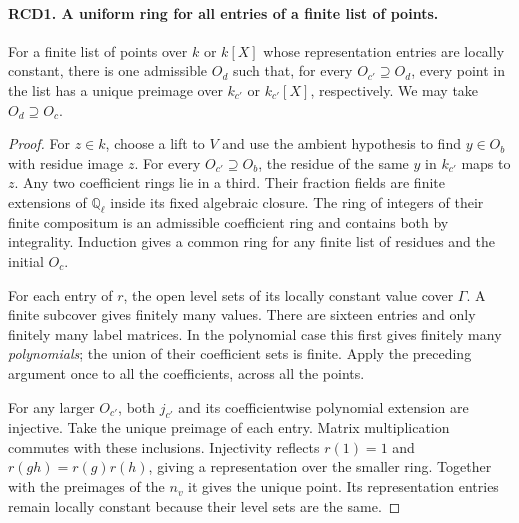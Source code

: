 \paragraph{RCD1. A uniform ring for all entries of a finite list of points.}
For a finite list of points over $k$ or $k[X]$ whose representation
entries are locally constant, there is one admissible $O_d$ such that,
for every $O_{c'}\supseteq O_d$, every point in the list has a unique
preimage over $k_{c'}$ or $k_{c'}[X]$, respectively. We may take
$O_d\supseteq O_c$.
\begin{proof}
For $z\in k$, choose a lift to $V$ and use the ambient hypothesis to
find $y\in O_b$ with residue image $z$. For every $O_{c'}\supseteq O_b$,
the residue of the same $y$ in $k_{c'}$ maps to $z$.
Any two coefficient rings lie in a third. Their fraction fields are
finite extensions of $\mathbb Q_\ell$ inside its fixed algebraic
closure. The ring of integers of their finite compositum is an
admissible coefficient ring and contains both by integrality.
Induction gives a common ring for any finite list of residues and
the initial $O_c$.

For each entry of $r$, the open level sets of its locally constant
value cover $\Gamma$. A finite subcover gives finitely many values.
There are sixteen entries and only finitely many label matrices.
In the polynomial case this first gives finitely many \emph{polynomials};
the union of their coefficient sets is finite. Apply the preceding
argument once to all the coefficients, across all the points.

For any larger $O_{c'}$, both $j_{c'}$ and its coefficientwise polynomial
extension are injective. Take the unique preimage of each entry.
Matrix multiplication commutes with these inclusions. Injectivity
reflects $r(1)=1$ and $r(gh)=r(g)r(h)$, giving a representation over
the smaller ring. Together with the preimages of the $n_v$ it gives the
unique point. Its representation entries remain locally constant
because their level sets are the same.
\end{proof}

